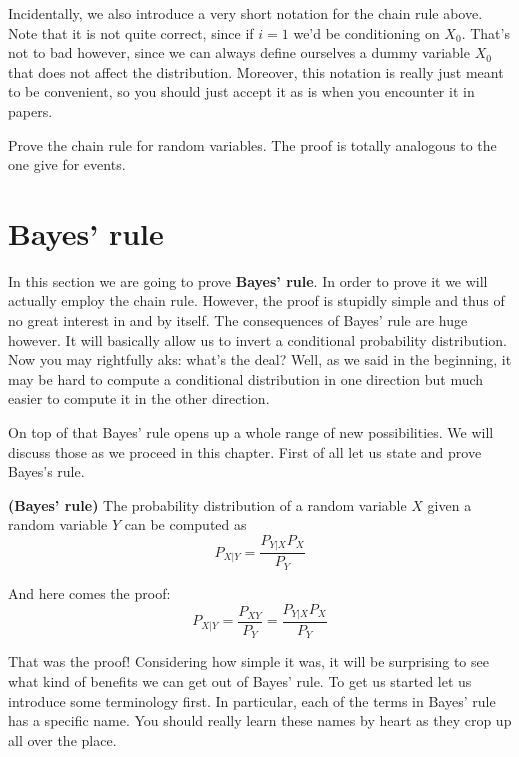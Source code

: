 Incidentally, we also introduce a very short notation for the chain rule above. Note that it is not quite correct, since if
$ i = 1 $ we'd be conditioning on $ X_{0} $. That's not to bad however, since we can always define ourselves a dummy variable
$ X_{0} $ that does not affect the distribution. Moreover, this notation is really just meant to be convenient, so you
should just accept it as is when you encounter it in papers.

\begin{Exercise}
Prove the chain rule for random variables. The proof is totally analogous to the one give for events.
\end{Exercise}

\section{Bayes' rule}

In this section we are going to prove \textbf{Bayes' rule}. In order to prove it we will actually employ the chain rule.
However, the proof is stupidly simple and thus of no great interest in and by itself. The consequences of Bayes' rule
are huge however. It will basically allow us to invert a conditional probability distribution. Now you may rightfully
aks: what's the deal? Well, as we said in the beginning, it may be hard to compute a conditional distribution in one
direction but much easier to compute it in the other direction.

On top of that Bayes' rule opens up a whole range of new possibilities. We will discuss those as we proceed in this
chapter. First of all let us state and prove Bayes's rule.
\begin{Theorem}{\textbf{(Bayes' rule)}}
The probability distribution of a random variable $ X $ given a random variable $ Y $ can be computed as
$$ P_{X|Y} = \dfrac{P_{Y|X}P_{X}}{P_{Y}} $$
\end{Theorem}

And here comes the proof:
\begin{equation}
P_{X|Y} = \dfrac{P_{XY}}{P_{Y}} = \dfrac{P_{Y|X}P_{X}}{P_{Y}}
\end{equation}

That was the proof! Considering how simple it was, it will be surprising to see what kind of benefits we can get out
of Bayes' rule. To get us started let us introduce some terminology first. In particular, each of the terms
in Bayes' rule has a specific name. You should really learn these names by heart as they crop up all over the place.

